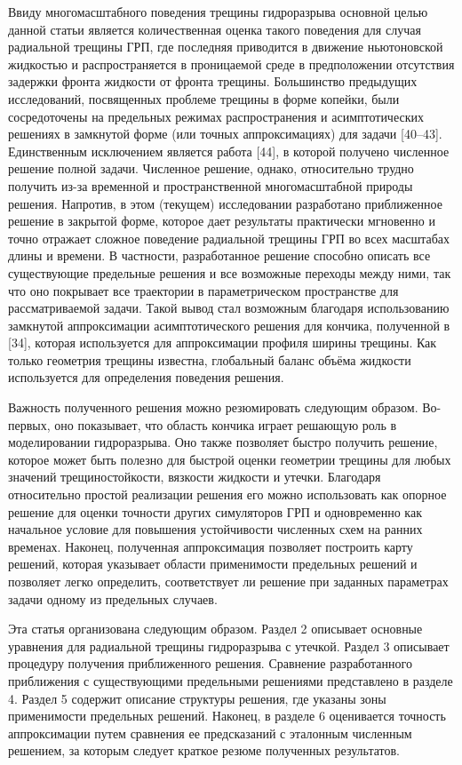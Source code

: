 \documentclass[main.tex]{subfiles}
\begin{document}
Ввиду многомасштабного поведения трещины гидроразрыва основной целью данной статьи является количественная оценка такого поведения для случая радиальной трещины ГРП, где последняя приводится в движение ньютоновской жидкостью и распространяется в проницаемой среде в предположении отсутствия задержки фронта жидкости от фронта трещины.
Большинство предыдущих исследований, посвященных проблеме трещины в форме копейки, были сосредоточены на предельных режимах распространения и асимптотических решениях в замкнутой форме (или точных аппроксимациях) для задачи [40–43].
Единственным исключением является работа [44], в которой получено численное решение полной задачи.
Численное решение, однако, относительно трудно получить из-за временной и пространственной многомасштабной природы решения.
Напротив, в этом (текущем) исследовании разработано приближенное решение в закрытой форме, которое дает результаты практически мгновенно и точно отражает сложное поведение радиальной трещины ГРП во всех масштабах длины и времени.
В частности, разработанное решение способно описать все существующие предельные решения и все возможные переходы между ними, так что оно покрывает все траектории в параметрическом пространстве для рассматриваемой задачи.
Такой вывод стал возможным благодаря использованию замкнутой аппроксимации асимптотического решения для кончика, полученной в [34], которая используется для аппроксимации профиля ширины трещины.
Как только геометрия трещины известна, глобальный баланс объёма жидкости используется для определения поведения решения.

Важность полученного решения можно резюмировать следующим образом.
Во-первых, оно показывает, что область кончика играет решающую роль в моделировании гидроразрыва.
Оно также позволяет быстро получить решение, которое может быть полезно для быстрой оценки геометрии трещины для любых значений трещиностойкости, вязкости жидкости и утечки.
Благодаря относительно простой реализации решения его можно использовать как опорное решение для оценки точности других симуляторов ГРП и одновременно как начальное условие для повышения устойчивости численных схем на ранних временах.
Наконец, полученная аппроксимация позволяет построить карту решений, которая указывает области применимости предельных решений и позволяет легко определить, соответствует ли решение при заданных параметрах задачи одному из предельных случаев.

Эта статья организована следующим образом.
Раздел 2 описывает основные уравнения для радиальной трещины гидроразрыва с утечкой.
Раздел 3 описывает процедуру получения приближенного решения.
Сравнение разработанного приближения с существующими предельными решениями представлено в разделе 4.
Раздел 5 содержит описание структуры решения, где указаны зоны применимости предельных решений.
Наконец, в разделе 6 оценивается точность аппроксимации путем сравнения ее предсказаний с эталонным численным решением, за которым следует краткое резюме полученных результатов.
\end{document}
